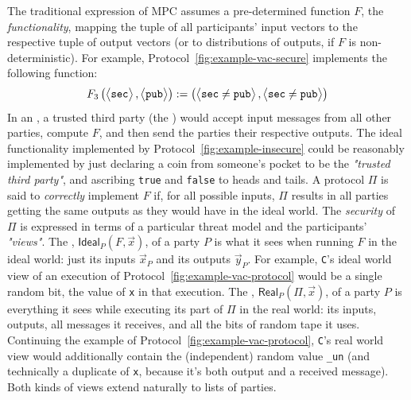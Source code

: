 \documentclass[acmlarge, manuscript, screen, review, anonymous, table]{acmart}
\newcommand{\bigpar}[1]{\left( #1 \right)}
\newcommand{\inlinecode}[2][cho]{\lstinline[language=#1]{#2}}
\newcommand{\vertvec}[1]{\left\langle { \renewcommand*{\arraystretch}{1}\begin{matrix} #1 \end{matrix} } \right\rangle}
\begin{document}
The traditional expression of MPC assumes a pre-determined function $F$, the \emph{functionality},
mapping the tuple of all participants' input vectors to the respective tuple of output vectors
(or to distributions of outputs, if $F$ is non-deterministic).
For example, Protocol~\ref{fig:example-vac-secure} implements the following function:
$$F_3\bigpar{\vertvec{\mathtt{sec}}, \vertvec{\mathtt{pub}}}
  := \bigpar{\vertvec{\mathtt{sec} \neq \mathtt{pub}}, \vertvec{\mathtt{sec} \neq \mathtt{pub}}}$$
In an , a trusted third party (the ) would accept input messages
from all other parties, compute $F$, and then send the parties their respective outputs.
The ideal functionality implemented by Protocol~\ref{fig:example-insecure}
could be reasonably implemented by just declaring a coin from someone's pocket to be the \textit{"trusted third party"},
and ascribing \inlinecode{true} and \inlinecode{false} to heads and tails.
A  protocol $Π$ is said to \emph{correctly} implement $F$ if, for all possible inputs,
$Π$ results in all parties getting the same outputs as they would have in the ideal world.
The \emph{security} of $Π$ is expressed in terms of a particular threat model and the participants' \textit{"views"}.
The , $\mathsf{Ideal}_P(F,\vec{x})$, of a party $P$ is what it sees when running $F$ in the ideal world:
just its inputs $\vec{x}_P$ and its outputs $\vec{y}_P$.
For example, \inlinecode{C}'s ideal world view of an execution of Protocol~\ref{fig:example-vac-protocol}
would be a single random bit, the value of \inlinecode{x} in that execution.
The , $\mathsf{Real}_P(Π, \vec{x})$, of a party $P$ is everything it sees while executing its part of $Π$ in the real world:
its inputs, outputs, all messages it receives, and all the bits of random tape it uses.
Continuing the example of Protocol~\ref{fig:example-vac-protocol}, \inlinecode{C}'s real world view would additionally contain
the (independent) random value \inlinecode{_un}
(and technically a duplicate of \inlinecode{x}, because it's both output and a received message).
Both kinds of views extend naturally to lists of parties.
\end{document}
